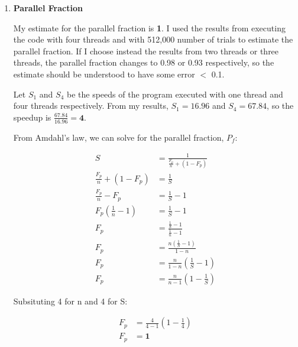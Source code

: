 \documentclass[11pt,letterpaper]{article}
\begin{document}
\begin{enumerate}
  \item \textbf{Parallel Fraction} 
  
    My estimate for the parallel fraction is \textbf{1}. 
    I used the results from executing the code with four
    threads and with 512,000 number of trials to estimate
    the parallel fraction. If I choose instead the results from 
    two threads or three threads, the parallel fraction changes to
    0.98 or 0.93 respectively, so the estimate should be understood
    to have some error $<$ 0.1.

    Let $S_1$ and $S_4$ be the speeds
    of the program executed with one thread and four threads
    respectively. From my results, $S_1 = 16.96$ and $S_4 = 67.84$,
    so the speedup is $\frac{67.84}{16.96} = \mathbf{4}.$

    From Amdahl's law, we can solve for
    the parallel fraction, $P_f$:

    \begin{align*}
      S &= \frac{1}{\frac{F_p}{n} + (1 - F_p)}\\
      \frac{F_p}{n} + (1 - F_p) &= \frac{1}{S}\\
      \frac{F_p}{n} -F_p &= \frac{1}{S} - 1\\
      F_p(\frac{1}{n} -1) &= \frac{1}{S} - 1\\
      F_p &= \frac{\frac{1}{S} - 1}{\frac{1}{n} -1}\\
      F_p &= \frac{n(\frac{1}{S} - 1)}{1 - n}\\
      F_p &= \frac{n}{1-n}(\frac{1}{S} - 1)\\
      F_p &= \frac{n}{n - 1}(1 - \frac{1}{S})
    \end{align*}

    Subsituting 4 for n and 4 for S:

    \begin{align*}
      F_p &= \frac{4}{4 - 1}(1 - \frac{1}{4})\\
      F_p &= \mathbf{1}
    \end{align*}

\end{enumerate}
\end{document}
